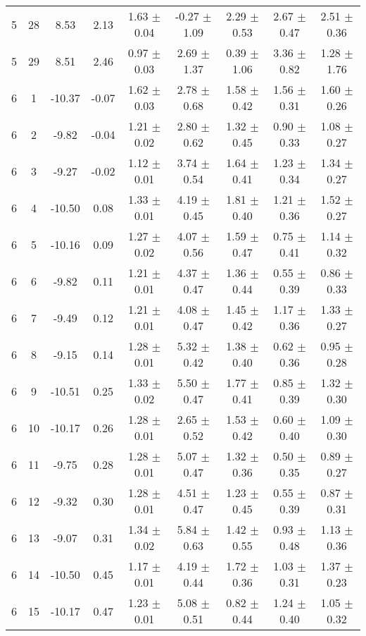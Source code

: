 \begin{landscape}
\begin{longtable}{ccccccccc}
   5 & 28 & 8.53 & 2.13 & 1.63 $\pm$ 0.04 & -0.27 $\pm$ 1.09 & 2.29 $\pm$ 0.53 & 2.67 $\pm$ 0.47 & 2.51 $\pm$ 0.36\\
   5 & 29 & 8.51 & 2.46 & 0.97 $\pm$ 0.03 & 2.69 $\pm$ 1.37 & 0.39 $\pm$ 1.06 & 3.36 $\pm$ 0.82 & 1.28 $\pm$ 1.76\\
 6 &  1 & -10.37 & -0.07 & 1.62 $\pm$ 0.03 & 2.78 $\pm$ 0.68 & 1.58 $\pm$ 0.42 & 1.56 $\pm$ 0.31 & 1.60 $\pm$ 0.26\\
 6 &  2 & -9.82 & -0.04 & 1.21 $\pm$ 0.02 & 2.80 $\pm$ 0.62 & 1.32 $\pm$ 0.45 & 0.90 $\pm$ 0.33 & 1.08 $\pm$ 0.27\\
 6 &  3 & -9.27 & -0.02 & 1.12 $\pm$ 0.01 & 3.74 $\pm$ 0.54 & 1.64 $\pm$ 0.41 & 1.23 $\pm$ 0.34 & 1.34 $\pm$ 0.27\\
   6 &  4 & -10.50 & 0.08 & 1.33 $\pm$ 0.01 & 4.19 $\pm$ 0.45 & 1.81 $\pm$ 0.40 & 1.21 $\pm$ 0.36 & 1.52 $\pm$ 0.27\\
   6 &  5 & -10.16 & 0.09 & 1.27 $\pm$ 0.02 & 4.07 $\pm$ 0.56 & 1.59 $\pm$ 0.47 & 0.75 $\pm$ 0.41 & 1.14 $\pm$ 0.32\\
   6 &  6 & -9.82 & 0.11 & 1.21 $\pm$ 0.01 & 4.37 $\pm$ 0.47 & 1.36 $\pm$ 0.44 & 0.55 $\pm$ 0.39 & 0.86 $\pm$ 0.33\\
   6 &  7 & -9.49 & 0.12 & 1.21 $\pm$ 0.01 & 4.08 $\pm$ 0.47 & 1.45 $\pm$ 0.42 & 1.17 $\pm$ 0.36 & 1.33 $\pm$ 0.27\\
   6 &  8 & -9.15 & 0.14 & 1.28 $\pm$ 0.01 & 5.32 $\pm$ 0.42 & 1.38 $\pm$ 0.40 & 0.62 $\pm$ 0.36 & 0.95 $\pm$ 0.28\\
   6 &  9 & -10.51 & 0.25 & 1.33 $\pm$ 0.02 & 5.50 $\pm$ 0.47 & 1.77 $\pm$ 0.41 & 0.85 $\pm$ 0.39 & 1.32 $\pm$ 0.30\\
   6 & 10 & -10.17 & 0.26 & 1.28 $\pm$ 0.01 & 2.65 $\pm$ 0.52 & 1.53 $\pm$ 0.42 & 0.60 $\pm$ 0.40 & 1.09 $\pm$ 0.30\\
   6 & 11 & -9.75 & 0.28 & 1.28 $\pm$ 0.01 & 5.07 $\pm$ 0.47 & 1.32 $\pm$ 0.36 & 0.50 $\pm$ 0.35 & 0.89 $\pm$ 0.27\\
   6 & 12 & -9.32 & 0.30 & 1.28 $\pm$ 0.01 & 4.51 $\pm$ 0.47 & 1.23 $\pm$ 0.45 & 0.55 $\pm$ 0.39 & 0.87 $\pm$ 0.31\\
   6 & 13 & -9.07 & 0.31 & 1.34 $\pm$ 0.02 & 5.84 $\pm$ 0.63 & 1.42 $\pm$ 0.55 & 0.93 $\pm$ 0.48 & 1.13 $\pm$ 0.36\\
   6 & 14 & -10.50 & 0.45 & 1.17 $\pm$ 0.01 & 4.19 $\pm$ 0.44 & 1.72 $\pm$ 0.36 & 1.03 $\pm$ 0.31 & 1.37 $\pm$ 0.23\\
   6 & 15 & -10.17 & 0.47 & 1.23 $\pm$ 0.01 & 5.08 $\pm$ 0.51 & 0.82 $\pm$ 0.44 & 1.24 $\pm$ 0.40 & 1.05 $\pm$ 0.32\\

\end{longtable}
\end{landscape}
